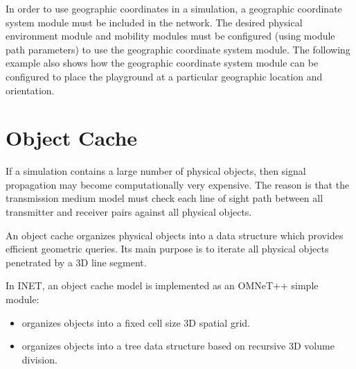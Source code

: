 In order to use geographic coordinates in a simulation, a geographic
coordinate system module must be included in the network. The desired
physical environment module and mobility modules must be configured (using
module path parameters) to use the geographic coordinate system module. The
following example also shows how the geographic coordinate system module
can be configured to place the playground at a particular geographic
location and orientation.


\section{Object Cache}

If a simulation contains a large number of physical objects, then signal
propagation may become computationally very expensive. The reason is that
the transmission medium model must check each line of sight path between
all transmitter and receiver pairs against all physical objects.

An object cache organizes physical objects into a data structure which provides
efficient geometric queries. Its main purpose is to iterate all physical objects
penetrated by a 3D line segment.

In INET, an object cache model is implemented as an OMNeT++ simple module:

\begin{itemize}
    \item {} organizes objects into a fixed cell size 3D spatial grid.
    \item {} organizes objects into a tree data structure based on recursive 3D volume division.
\end{itemize}






